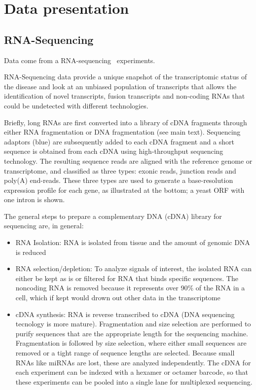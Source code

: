 \chapter{Data presentation}\label{ch:data}
\section{RNA-Sequencing}\label{sec:rnaseq}
Data come from a  RNA-sequencing~\cite{wang2009rna} experiments.
 
RNA-Sequencing data provide a unique snapshot of the transcriptomic status of the disease and look at an unbiased population of transcripts that allows the identification of novel transcripts, fusion transcripts and non-coding RNAs that could be undetected with different technologies.

Briefly, long RNAs are first converted into a library of cDNA fragments through either RNA fragmentation or DNA fragmentation (see main text). Sequencing adaptors (blue) are subsequently added to each cDNA fragment and a short sequence is obtained from each cDNA using high-throughput sequencing technology. The resulting sequence reads are aligned with the reference genome or transcriptome, and classified as three types: exonic reads, junction reads and poly(A) end-reads. These three types are used to generate a base-resolution expression profile for each gene, as illustrated at the bottom; a yeast ORF with one intron is shown.



The general steps to prepare a complementary DNA (cDNA) library for sequencing are, in general:

\begin{itemize}
\item RNA Isolation: RNA is isolated from tissue and the amount of genomic DNA is reduced
\item RNA selection/depletion: To analyze signals of interest, the isolated RNA can either be kept as is or filtered for RNA that binds specific sequences. The noncoding RNA is removed because it represents over 90$\%$ of the RNA in a cell, which if kept would drown out other data in the transcriptome
\item cDNA synthesis: RNA is reverse transcribed to cDNA (DNA sequencing tecnology is more mature). Fragmentation and size selection are performed to purify sequences that are the appropriate length for the sequencing machine.  Fragmentation is followed by size selection, where either small sequences are removed or a tight range of sequence lengths are selected. Because small RNAs like miRNAs are lost, these are analyzed independently. The cDNA for each experiment can be indexed with a hexamer or octamer barcode, so that these experiments can be pooled into a single lane for multiplexed sequencing.
\end{itemize}

